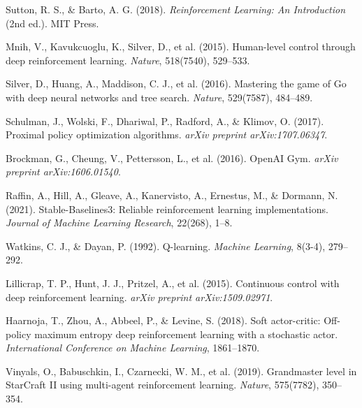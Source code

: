 \documentclass[12pt,a4paper]{article}
\begin{document}
\begin{thebibliography}{99}

Sutton, R. S., \& Barto, A. G. (2018). 
\textit{Reinforcement Learning: An Introduction} (2nd ed.). 
MIT Press.

Mnih, V., Kavukcuoglu, K., Silver, D., et al. (2015). 
Human-level control through deep reinforcement learning. 
\textit{Nature}, 518(7540), 529--533.

Silver, D., Huang, A., Maddison, C. J., et al. (2016). 
Mastering the game of Go with deep neural networks and tree search. 
\textit{Nature}, 529(7587), 484--489.

Schulman, J., Wolski, F., Dhariwal, P., Radford, A., \& Klimov, O. (2017). 
Proximal policy optimization algorithms. 
\textit{arXiv preprint arXiv:1707.06347}.

Brockman, G., Cheung, V., Pettersson, L., et al. (2016). 
OpenAI Gym. 
\textit{arXiv preprint arXiv:1606.01540}.

Raffin, A., Hill, A., Gleave, A., Kanervisto, A., Ernestus, M., \& Dormann, N. (2021). 
Stable-Baselines3: Reliable reinforcement learning implementations. 
\textit{Journal of Machine Learning Research}, 22(268), 1--8.

Watkins, C. J., \& Dayan, P. (1992). 
Q-learning. 
\textit{Machine Learning}, 8(3-4), 279--292.

Lillicrap, T. P., Hunt, J. J., Pritzel, A., et al. (2015). 
Continuous control with deep reinforcement learning. 
\textit{arXiv preprint arXiv:1509.02971}.

Haarnoja, T., Zhou, A., Abbeel, P., \& Levine, S. (2018). 
Soft actor-critic: Off-policy maximum entropy deep reinforcement learning with a stochastic actor. 
\textit{International Conference on Machine Learning}, 1861--1870.

Vinyals, O., Babuschkin, I., Czarnecki, W. M., et al. (2019). 
Grandmaster level in StarCraft II using multi-agent reinforcement learning. 
\textit{Nature}, 575(7782), 350--354.

\end{thebibliography}
\end{document}

